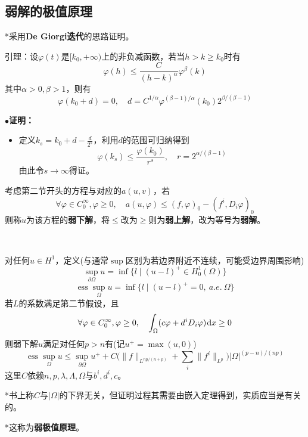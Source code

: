 \documentclass[a4paper,UTF8,fontset=windows,AutoFakeBold]{ctexart}
\newcommand*{\dr}{\hspace{0.07em}\mathrm{d}}
\DeclareMathOperator*{\ess}{ess}
\newcommand{\proo}[1]{{\kaishu $\bullet$\textbf{证明：}
\begin{itemize}
    \item[] #1
\end{itemize}
}}
\begin{document}
\subsection{弱解的极值原理}
*采用\textbf{De Giorgi迭代}的思路证明。

引理：设$\varphi(t)$是$[k_0,+\infty)$上的非负减函数，若当$h>k\ge k_0$时有
$$\varphi(h)\le\frac{C}{(h-k)^\alpha}\varphi^\beta(k)$$
其中$\alpha>0,\beta>1$，则有
$$\varphi(k_0+d)=0,\quad d=C^{1/\alpha}\varphi^{(\beta-1)/\alpha}(k_0)2^{\beta/(\beta-1)}$$

\proo{
    定义$k_s=k_0+d-\frac{d}{2^s}$，利用$d$的范围可归纳得到
    $$\varphi(k_s)\le\frac{\varphi(k_0)}{r^s},\quad r=2^{\alpha/(\beta-1)}$$
    由此令$s\to\infty$得证。
}

考虑第二节开头的方程与对应的$a(u,v)$，若
$$\forall\varphi\in C_0^\infty,\varphi\ge0,\quad a(u,\varphi)\le(f,\varphi)_0-(f^i,D_i\varphi)_0$$
则称$u$为该方程的\textbf{弱下解}，将$\le$改为$\ge$则为\textbf{弱上解}，改为等号为\textbf{弱解}。

\

对任何$u\in H^1$，定义(与通常$\sup$区别为若边界附近不连续，可能受边界周围影响)
$$\sup_{\partial\Omega}u=\inf\{l\mid(u-l)^+\in H_0^1(\Omega)\}$$
$$\ess\sup_\Omega u=\inf\{l\mid(u-l)^+=0,\ a.e.\ \Omega\}$$
若$L$的系数满足第二节假设，且
$$\forall\varphi\in C_0^\infty,\varphi\ge0,\quad\int_\Omega(c\varphi+d^iD_i\varphi)\dr x\ge0$$
则弱下解$u$满足对任何$p>n$有(记$u^+=\max(u,0)$)
$$\ess\sup_\Omega u\le\sup_{\partial\Omega}u^++C\bigg(\|f\|_{L^{np/(n+p)}}+\sum_i\|f^i\|_{L^p}\bigg)|\Omega|^{(p-n)/(np)}$$
这里$C$依赖$n,p,\lambda,\Lambda,\Omega$与$b^i,d^i,c$。

*书上称$C$与$|\Omega|$的下界无关，但证明过程其需要由嵌入定理得到，实质应当是有关的。

*这称为\textbf{弱极值原理}。
\end{document}
